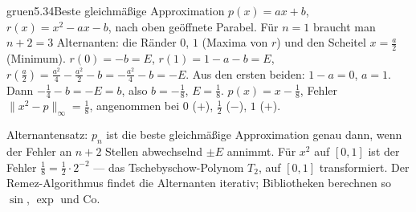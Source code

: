 \begin{loesungkarte}{gruen}{5.34}{Beste gleichmäßige Approximation}
$p(x) = ax + b$, $r(x) = x^{2} - ax - b$, nach oben geöffnete Parabel. Für $n = 1$ braucht man $n + 2 = 3$ Alternanten: die Ränder $0$, $1$ (Maxima von $r$) und den Scheitel $x = \frac a2$ (Minimum).
$r(0) = -b = E$, $r(1) = 1 - a - b = E$, $r(\frac a2) = \frac{a^{2}}4 - \frac{a^{2}}2 - b = -\frac{a^{2}}4 - b = -E$.
Aus den ersten beiden: $1 - a = 0$, $a = 1$. Dann $-\frac14 - b = -E = b$, also $b = -\frac18$, $E = \frac18$.
$p(x) = x - \frac18$, Fehler $\|x^{2} - p\|_\infty = \frac18$, angenommen bei $0$ ($+$), $\frac12$ ($-$), $1$ ($+$).
\begin{mitnehmen}\kastentext
Alternantensatz: $p_n$ ist die beste gleichmäßige Approximation genau dann, wenn der Fehler an $n + 2$ Stellen abwechselnd $\pm E$ annimmt. Für $x^{2}$ auf $[0, 1]$ ist der Fehler $\frac18 = \frac12\cdot2^{-2}$ --- das Tschebyschow-Polynom $T_2$, auf $[0, 1]$ transformiert. Der Remez-Algorithmus findet die Alternanten iterativ; Bibliotheken berechnen so $\sin$, $\exp$ und Co.
\end{mitnehmen}
\end{loesungkarte}

